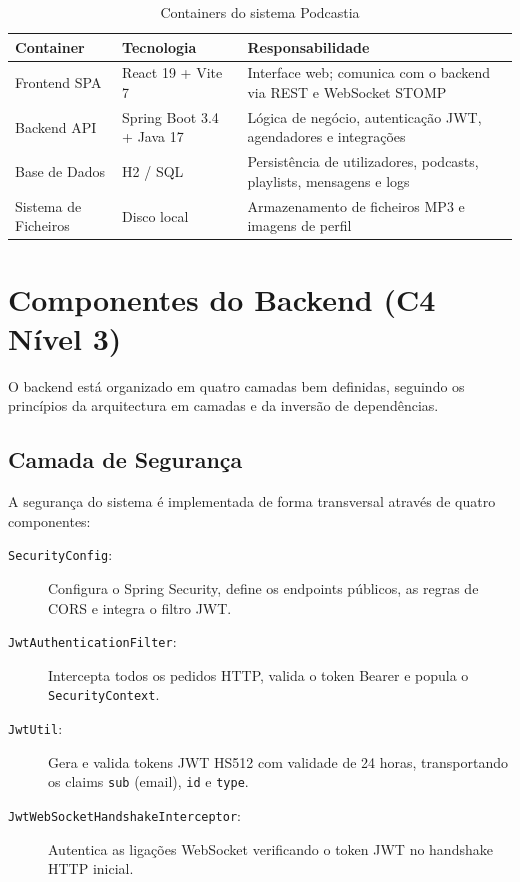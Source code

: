 \documentclass[12pt, a4paper]{report}
\begin{document}
\begin{table}[H]
  \centering
  \begin{tabularx}{\textwidth}{L{3cm} L{3.5cm} X}
    \toprule
    \textbf{Container} & \textbf{Tecnologia} & \textbf{Responsabilidade} \\
    \midrule
    Frontend SPA       & React 19 + Vite 7   & Interface web; comunica com o backend via REST e WebSocket STOMP \\
    Backend API        & Spring Boot 3.4 + Java 17 & Lógica de negócio, autenticação JWT, agendadores e integrações \\
    Base de Dados      & H2 / SQL            & Persistência de utilizadores, podcasts, playlists, mensagens e logs \\
    Sistema de Ficheiros & Disco local        & Armazenamento de ficheiros MP3 e imagens de perfil \\
    \bottomrule
  \end{tabularx}
  \caption{Containers do sistema Podcastia}
  \label{tab:containers}
\end{table}

\section{Componentes do Backend (C4 Nível 3)}

O backend está organizado em quatro camadas bem definidas, seguindo os princípios
da arquitectura em camadas e da inversão de dependências.

\subsection{Camada de Segurança}

A segurança do sistema é implementada de forma transversal através de quatro
componentes:

\begin{description}
  \item[\texttt{SecurityConfig}:] Configura o Spring Security, define os endpoints públicos, as regras de CORS e integra o filtro JWT.
  \item[\texttt{JwtAuthenticationFilter}:] Intercepta todos os pedidos HTTP, valida o token Bearer e popula o \texttt{SecurityContext}.
  \item[\texttt{JwtUtil}:] Gera e valida tokens JWT HS512 com validade de 24 horas, transportando os claims \texttt{sub} (email), \texttt{id} e \texttt{type}.
  \item[\texttt{JwtWebSocketHandshakeInterceptor}:] Autentica as ligações WebSocket verificando o token JWT no handshake HTTP inicial.
\end{description}
\end{document}
